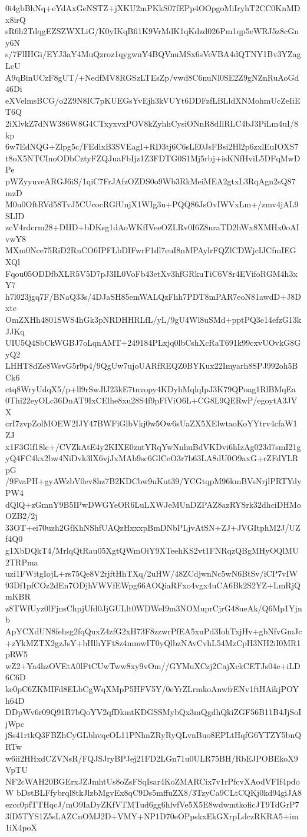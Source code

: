 0i4gbBhNq+eYdAxGeNSTZ+jXKU2mPKkS07fEPp4OOpgoMiIryhT2CC0KnMDx8irQ
sR6h2TdqgEZSZWXLiG/K0yIKqBfi1K9VrMdK1qKdzd026Pm1qp5eWRJ5z8cGny6N
s/7FlIHGi/EYJ3aY4MuQzroz1qygwnY4BQVnuMSx6sVeVBA4dQTNY1Bv3YZagLcU
A9qBinUCzF8gUT/+NedfMV8RGSzLTEsZp/vwd8C6nuNl0SE2Z9gNZnRuAoGd46Di
eXVelmsBCG/o2Z9N8IC7pKUEGsYvEjh3kVUYt6DDFzfLBLldXNMohmUcZeIiET6Q
2iXlvkZ7dNW386W8G4CTxyxvxPOV8kZyhhCysiONnR8dIlRLC4bJ3PiLm4uI/8kp
6w7EdNQG+Zlpg5c/FEdlxB3SVEagI+RD3tj6C6sLE0JsFBsi2Hl2p6zxlEuIOXS7
t8oX5NTCInoODbCztyFZQJuaFbIjz1Z3FDTG0S1Mj5rbj+isKNfHviL5DFqMwDPe
pWZyyuveARGJ6iS/1qiC7FrJAfzOZDS0o9Wb3RkMeiMEA2gtxL3RqAgn2sQ87mzD
M0u0OftRVd58TvJ5CUcocRGlUnjX1WIg3u+PQQ86JsOvIWVxLm+/zmv4jAL9SLID
zcV4rdcrm28+DHD+bDKsg1dAoWKfIVeeOZLRv0I6Z8nraTD2hWx8XMHx0oAIvwY8
MXm0Nce75RiD2RnCO6IPFLbDIFwrF1dl7euI8nMPAylrFQZlCDWjcIJCfmIEGXQl
Fqou05ODDfbXLR5V5D7pJ3IL0VoFb43etXv3hfGRkuTiC6V8r4EVifoRGM4h3xY7
h7l023jgq7F/BNaQ33s/4DJaSH85emWALQzFhh7PDT8mPAR7eoN81awdD+J8Dxte
OmZXHh4801SWS4hGk3pNRDHHRLfL/yL/9gU4Wl8uSMd+pptPQ3e14efzG13kJJKq
UIU5Q4SbCkWGBJ7oLqnAMT+249184PLxjq0lbCshXcRaT691k99cxvUOvkG8GyQ2
LHHT8dZe8WsvG5r9p4/9QgUw7ujoUARfREQZ0BYKux22Imyarh8SPJ992oh5BCk6
ctq8WryUdqX5/p+ll9rSwJlJ23kE7tnvopy4KDyhMqlqIpJ3K79QPoag1RlBMqEa
0Thi22eyOLc36DnAT9IxCElhe8xu28S4f9pFfViO6L+CG8L9QERwP/egoytA3JVX
crI7zvpZolMOEW2IJY47BWFiGlbVkj0w5Ow6sUaZX5XElwtaoKoYYtrv4cfaW1ZJ
x1F3Glf18lc+/CVZkAtE4y2KIXE0zntYRqYwNnhuBdVKDvi6hIzAg023d7smI21g
yQ4FC4kx2bw4NiDvk3lX6vjJxMAb9sc6GlCeO3r7b63LA8dU0O9axG+rZFdYLRpG
/9FvaPH+gyAWzbV0ev8hz7B2KDCbw9uKut39/YCGtqpM96kmBVsNrjlPRTYdyPW4
dQlQ+zGmnY9B5IPwDWGYeOR6LuLXWJeMUnDZPAZ8azRYSrk32dhciDHMoOZB2/2j
33OT+ei70uzh2GfKhNShfUAQzHxxxpBmDNbPLjvAtSN+ZJ+JVGItphM2J/UZf4Q0
g1XbDQkT4/MrlqQtRau05XgtQWmOiY9XTeehKS2vt1FNRqzQBgMHyOQlMU2TRPma
uzi1FWitgIojL+rs75Qe8V2rjftHhTXq/2uHW/48ZCdjwnNc5wN6BtSv/iCP7vIW
93Df1pfCOz2dEn7ODjhVWVfEWpg66AOQiaRFxo4vgx4uCA6Bk2S2YZ+LmRjQmKBR
z8TWfUyz0lFjnsChpjUfd0JjGULlt0WDWeI9m3NOMuprCjrG48ueAk/Q6Mp1Yjnb
ApYCXdUN8fehsg2fqQuxZ4zfG2xH73F8zzwrPfEA5xuPd3IohTxjHv+gbNfvGmJc
+zYkMZTX2gzJsY+bHlhYFt8z4mmwIT0yQlbzNAvCvhL54MzCpH3NH2iI0MR1pRW5
wZ2+Ya4hzOVEtA0lFtCUwTww8xy9vOm//GYMuXCzj2CajXckCETJs04e+iLD6C6D
ke0pC6ZKMIFd8ELbCgWqXMpP5HFV5Y/0eYrZLrmkoAnwfrENv1ftHAikjPOYh64D
DDpWv6r09Q91R7bQoYV2qfDkmtKDGSSMybQx3mQgdhQkiZGF56B11B4JjSoIjWpc
jSs41rtkQ3FBZhCyGLbhvqeOL11PNhnZRyRyQLvnBuo8EPLtHqfG6YTZY5bnQRTw
w6ii2HHxdCZVNsR/FQJSJryBPJej21FD2LGn71u0ULR75BH/RbEJPOBEkoX9VpTU
NF2cWAH20BGErxJZJmhtUs8oZsFSqIsar4KoZMARCix7v1rPfcvXAodVFIf4pdoW
bDstBLFfybrql8tkJlzbMgvEx8qC9Ds5mffuZX8/3TzyCa9CLtCQKj0kd94giJA8
ezcc0pfTTHqcJ/mO9IaDyZKfVTMTud6gg6hlvfVe5X5E8wdwmtkoficJT9TdGrP7
3lD5TYS1Z5sLAZCnOMJ2D+VMY+NP1D70eOPpskxEkGXrpLdczRKRA5+im1iX4poX
